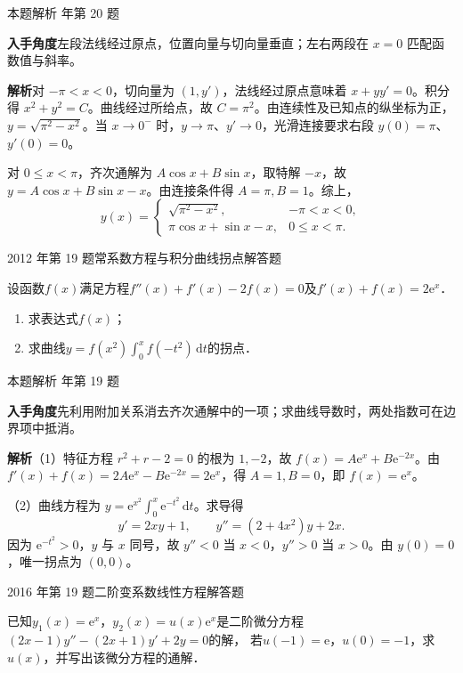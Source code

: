 \documentclass[UTF8,zihao=-4,fontset=fandol]{ctexart}
\newcommand{\QuestionPage}[6]{%
  \par\noindent\begin{minipage}{\linewidth}
  \raggedright
  {\small\textcolor{black!60}{#3\quad #5}\hfill\textcolor{accent}{#2}}\par\smallskip}
\newcommand{\QuestionEnd}{\end{minipage}\par\medskip}
\newcommand{\QuestionPage}[6]{%
  \clearpage
  {\small\textcolor{accent}{#1\hfill #2}}\par\medskip
  {\small\textcolor{black!60}{#3\quad #5\hfill #6}}\par\vspace{9bp}}
\newcommand{\QuestionEnd}{}
\newenvironment{QuestionSolution}[1]{%
  \clearpage
  {\small\textcolor{black!60}{本题解析\quad #1}}\par\medskip
}{\par\clearpage}
\begin{document}
\begin{QuestionSolution}{2009 年第 20 题}
\textbf{入手角度}\quad 左段法线经过原点，位置向量与切向量垂直；左右两段在 \(x=0\) 匹配函数值与斜率。

\textbf{解析}\quad 对 \(-\pi<x<0\)，切向量为 \((1,y')\)，法线经过原点意味着 \(x+yy'=0\)。积分得 \(x^2+y^2=C\)。曲线经过所给点，故 \(C=\pi^2\)。由连续性及已知点的纵坐标为正，\(y=\sqrt{\pi^2-x^2}\)。当 \(x\to0^-\) 时，\(y\to\pi\)、\(y'\to0\)，光滑连接要求右段 \(y(0)=\pi\)、\(y'(0)=0\)。

对 \(0\le x<\pi\)，齐次通解为 \(A\cos x+B\sin x\)，取特解 \(-x\)，故 \(y=A\cos x+B\sin x-x\)。由连接条件得 \(A=\pi,B=1\)。综上，
\[
\boxed{y(x)=
\begin{cases}
\sqrt{\pi^2-x^2},&-\pi<x<0,\\
\pi\cos x+\sin x-x,&0\le x<\pi.
\end{cases}}
\]
\end{QuestionSolution}

\QuestionPage{4.2 高阶线性微分方程}{解答题}{2012 年第 19 题}{3}{常系数方程与积分曲线拐点}{232 / 234}
设函数$f(x)$满足方程$f''(x) + f'(x) - 2f(x) = 0$及$f'(x) + f(x) = 2\mathrm{e}^x$．
\begin{enumerate}
\item 求表达式$f(x)$；
\item 求曲线$y = f(x^2)\int_0^x f(- t^2)\,\mathrm{d} t$的拐点．
\end{enumerate}
\QuestionEnd

\begin{QuestionSolution}{2012 年第 19 题}
\textbf{入手角度}\quad 先利用附加关系消去齐次通解中的一项；求曲线导数时，两处指数可在边界项中抵消。

\textbf{解析}\quad （1）特征方程 \(r^2+r-2=0\) 的根为 \(1,-2\)，故 \(f(x)=A\mathrm{e}^x+B\mathrm{e}^{-2x}\)。由 \(f'(x)+f(x)=2A\mathrm{e}^x-B\mathrm{e}^{-2x}=2\mathrm{e}^x\)，得 \(A=1,B=0\)，即 \(\boxed{f(x)=\mathrm{e}^x}\)。

（2）曲线方程为 \(y=\mathrm{e}^{x^2}\int_0^x \mathrm{e}^{-t^2}\,\mathrm{d}t\)。求导得
\[
y'=2xy+1,\qquad
y''=(2+4x^2)y+2x.
\]
因为 \(\mathrm{e}^{-t^2}>0\)，\(y\) 与 \(x\) 同号，故 \(y''<0\) 当 \(x<0\)，\(y''>0\) 当 \(x>0\)。由 \(y(0)=0\)，唯一拐点为 \(\boxed{(0,0)}\)。
\end{QuestionSolution}

\QuestionPage{4.2 高阶线性微分方程}{解答题}{2016 年第 19 题}{3}{二阶变系数线性方程}{233 / 234}
已知$y_1(x) = \mathrm{e}^x$，$y_2(x) = u(x) \mathrm{e}^x$是二阶微分方程$(2x - 1)y'' - (2x + 1)y' + 2y = 0$的解，
若$u(- 1) = \mathrm{e}$，$u(0) = - 1$，求$u(x)$，并写出该微分方程的通解．
\QuestionEnd
\end{document}
